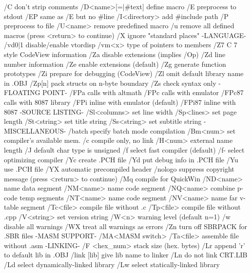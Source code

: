{/C don't strip comments                 /D<name>[=|#text] define macro
/E preprocess to stdout                 /EP same as /E but no #line
/I<directory> add #include path         /P preprocess to file
/U<name> remove predefined macro        /u remove all defined macros
  (press <return> to continue)
/X ignore "standard places"
                              -LANGUAGE-
/vd{0|1} disable/enable vtordisp        /vm<x> type of pointers to members
/Z7 C 7 style CodeView information      /Za disable extensions (implies /Op)
/Zd line number information             /Ze enable extensions (default)
/Zg generate function prototypes        /Zi prepare for debugging (CodeView)
/Zl omit default library name in .OBJ   /Zp[n] pack structs on n-byte boundary
/Zs check syntax only
                           -FLOATING POINT-
/FPa calls with altmath                 /FPc calls with emulator
/FPc87 calls with 8087 library          /FPi inline with emulator (default)
/FPi87 inline with 8087
                          -SOURCE LISTING-
/Sl<columns> set line width             /Sp<lines> set page length
/St<string> set title string            /Ss<string> set subtitle string
                           -MISCELLANEOUS-
/batch specify batch mode compilation   /Bm<num> set compiler's available mem.
/c compile only, no link                /H<num> external name length
/J default char type is unsigned        /f select fast compiler (default)
/f- select optimizing compiler          /Yc create .PCH file
/Yd put debug info in .PCH file         /Yu use .PCH file
/YX automatic precompiled header        /nologo suppress copyright message
  (press <return> to continue)
/Mq compile for QuickWin                /ND<name> name data segment
/NM<name> name code segment             /NQ<name> combine p-code temp segments
/NT<name> name code segment             /NV<name> name far v-table segment
/Tc<file> compile file without .c       /Tp<file> compile file without .cpp
/V<string> set version string           /W<n> warning level (default n=1)
/w disable all warnings                 /WX treat all warnings as errors
/Zn turn off SBRPACK for .SBR files
                            -MASM SUPPORT-
/MA<MASM switch>                        /Ta<file> assemble file without .asm
                              -LINKING-
/F <hex_num> stack size (hex. bytes)    /Lr append 'r' to default lib in .OBJ
/link [lib] give lib name to linker     /Ln do not link CRT.LIB
/Ld select dynamically-linked library   /Lw select statically-linked library
\EndVerbatim


\EndList

}
